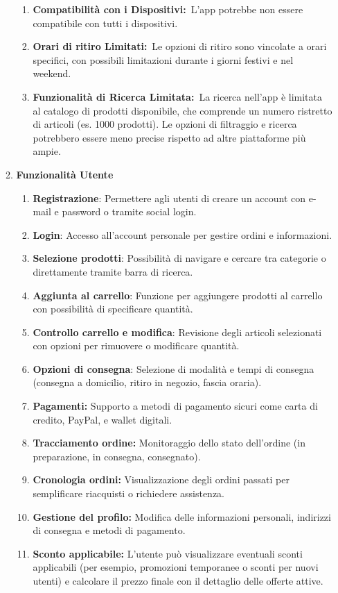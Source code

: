 \documentclass[a4paper,12pt]{article}
\begin{document}
\begin{enumerate}
\begin{enumerate}
\begin{enumerate}
   \item \textbf{Compatibilità con i Dispositivi:} L'app potrebbe non essere compatibile con tutti i dispositivi. 
   
   \item \textbf{Orari di ritiro Limitati:} Le opzioni di ritiro sono vincolate a orari specifici, con possibili limitazioni durante i giorni festivi e nel weekend.
   
   \item \textbf{Funzionalità di Ricerca Limitata:} La ricerca nell'app è limitata al catalogo di prodotti disponibile, che comprende un numero ristretto di articoli (es. 1000 prodotti). Le opzioni di filtraggio e ricerca potrebbero essere meno precise rispetto ad altre piattaforme più ampie. 
   \end{enumerate}
   
   \item\textbf{Funzionalità Utente}
   
       \begin{enumerate}[label=\arabic*.]
       \item \textbf{Registrazione}: Permettere agli utenti di creare un account con e-mail e password o tramite social login.
       \item \textbf{Login}: Accesso all’account personale per gestire ordini e informazioni.
       \item \textbf{Selezione prodotti}: Possibilità di navigare e cercare tra categorie o direttamente tramite barra di ricerca.
       \item \textbf{Aggiunta al carrello}: Funzione per aggiungere prodotti al carrello con possibilità di specificare quantità.
       \item \textbf{Controllo carrello e modifica}: Revisione degli articoli selezionati con opzioni per rimuovere o modificare quantità.
       \item \textbf{Opzioni di consegna}: Selezione di modalità e tempi di consegna (consegna a domicilio, ritiro in negozio, fascia oraria).
       \item \textbf{Pagamenti:} Supporto a metodi di pagamento sicuri come carta di credito, PayPal, e wallet digitali.
       \item \textbf{Tracciamento ordine:} Monitoraggio dello stato dell’ordine (in preparazione, in consegna, consegnato).
       \item \textbf{Cronologia ordini:} Visualizzazione degli ordini passati per semplificare riacquisti o richiedere assistenza.
       \item \textbf{Gestione del profilo:} Modifica delle informazioni personali, indirizzi di consegna e metodi di pagamento.
       \item \textbf{Sconto applicabile:} L'utente può visualizzare eventuali sconti applicabili (per esempio, promozioni temporanee o sconti per nuovi utenti) e calcolare il prezzo finale con il dettaglio delle offerte attive.
       \end{enumerate}
   

\end{enumerate}
\end{enumerate}
\end{document}
